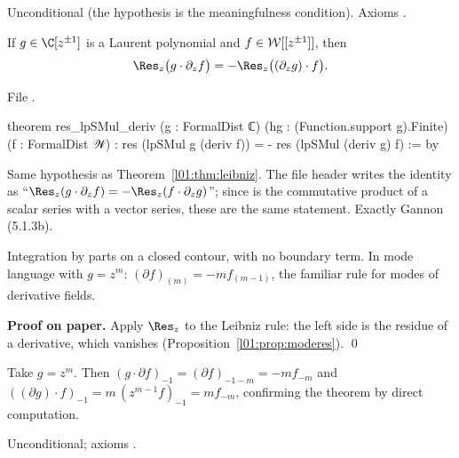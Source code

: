 \begin{status}
Unconditional (the hypothesis is the meaningfulness condition). Axioms
.
\end{status}

\begin{theorem}\label{l01:thm:byparts}
If $g\in\C[z^{\pm1}]$ is a Laurent polynomial and $f\in\mathcal{W}[[z^{\pm1}]]$, then
\begin{equation*}
  \Res_z\big(g\cdot\partial_zf\big) = -\Res_z\big((\partial_zg)\cdot f\big).
\end{equation*}
\end{theorem}

\noindent File .
\begin{leancode}
theorem res_lpSMul_deriv (g : FormalDist ℂ) (hg : (Function.support g).Finite)
    (f : FormalDist 𝒲) : res (lpSMul g (deriv f)) = - res (lpSMul (deriv g) f) := by
\end{leancode}

\begin{dictionary}
Same hypothesis as Theorem~\ref{l01:thm:leibniz}. The file header writes the identity as
``$\Res_z(g\cdot\partial_zf) = -\Res_z(f\cdot\partial_zg)$''; since  is the commutative product of a
scalar series with a vector series, these are the same statement. Exactly Gannon (5.1.3b).
\end{dictionary}

\begin{physics}
Integration by parts on a closed contour, with no boundary term. In mode language with $g = z^{m}$:
$(\partial f)_{(m)} = -m f_{(m-1)}$, the familiar rule for modes of derivative fields.
\end{physics}

\textbf{Proof on paper.} Apply $\Res_z$ to the Leibniz rule: the left side is the residue of a derivative,
which vanishes (Proposition~\ref{l01:prop:moderes}). \qed

\begin{example}
Take $g = z^m$. Then $(g\cdot\partial f)_{-1} = (\partial f)_{-1-m} = -m f_{-m}$ and
$((\partial g)\cdot f)_{-1} = m\,(z^{m-1}f)_{-1} = mf_{-m}$, confirming the theorem by direct computation.
\end{example}

\begin{status}
Unconditional; axioms .
\end{status}


